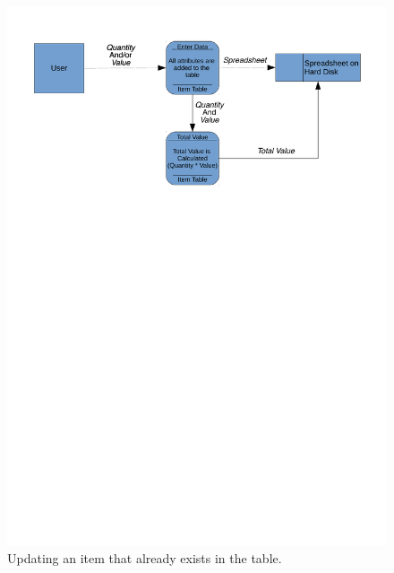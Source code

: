 \begin{center}
    \begin{figure}[H]
        \centerline{\includegraphics[width=\textwidth]{./Analysis/Dataflow/Old_System/Old_Sys_Data_flow_update.pdf}}
        \caption{Updating an item that already exists in the table.} \label{fig:print_function_result}
    \end{figure}
    

\end{center}
